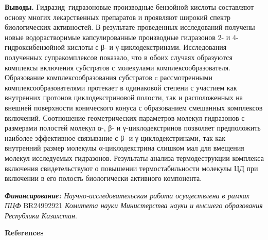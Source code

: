 \begin{multicols}{2}
{\bfseries Выводы.} Гидразид--гидразоновые производные бензойной кислоты
составляют основу многих лекарственных препаратов и проявляют широкий
спектр биологических активностей. В результате проведенных исследований
получены новые водорастворимые капсулированные производные гидразонов 2-
и 4-гидроксибензойной кислоты с β- и γ-циклодекстринами. Исследования
полученных супракомплексов показало, что в обоих случаях образуются
комплексы включения субстратов с молекулами комплексообразователя.
Образование комплексообразования субстратов c рассмотренными
комплексообразователями протекает в одинаковой степени с участием как
внутренних протонов циклодекстриновой полости, так и расположенных на
внешней поверхности конического конуса с образованием смешанных
комплексов включений. Соотношение геометрических параметров молекул
гидразонов с размерами полостей молекул α-, β- и γ-циклодекстринов
позволяет предположить наиболее эффективное связывание с β- и
γ-циклодекстринами, так как внутренний размер молекулы α-циклодекстрина
слишком мал для вмещения молекул исследуемых гидразонов. Результаты
анализа термодеструкции комплекса включения свидетельствуют о повышении
термостабильности молекулы ЦД при включении в его полость биологически
активного компонента.

\emph{{\bfseries Финансирование:} Научно-исследовательская работа
осуществлена в рамках ПЦФ} BR24992921 \emph{Комитета науки Министерства
науки и высшего образования Республики Казахстан}.
\end{multicols}

\begin{center}
{\bfseries References}
\end{center}

